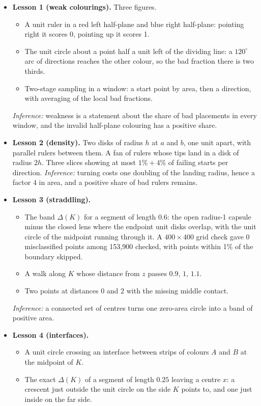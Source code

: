 \documentclass[11pt]{article}
\theoremstyle{definition}
\theoremstyle{remark}
\begin{document}
\begin{itemize}
\item \textbf{Lesson 1 (weak colourings).} Three figures.
  \begin{itemize}
  \item A unit ruler in a red left half-plane and blue right half-plane: pointing right it scores 0, pointing up it scores 1.
  \item The unit circle about a point half a unit left of the dividing line: a $120^\circ$ arc of directions reaches the other colour, so the bad fraction there is two thirds.
  \item Two-stage sampling in a window: a start point by area, then a direction, with averaging of the local bad fractions.
  \end{itemize}
  \emph{Inference:} weakness is a statement about the share of bad placements in every window, and the invalid half-plane colouring has a positive share.
\item \textbf{Lesson 2 (density).} Two disks of radius $h$ at $a$ and $b$, one unit apart, with parallel rulers between them. A fan of rulers whose tips land in a disk of radius $2h$. Three slices showing at most $1\%+4\%$ of failing starts per direction. \emph{Inference:} turning costs one doubling of the landing radius, hence a factor $4$ in area, and a positive share of bad rulers remains.
\item \textbf{Lesson 3 (straddling).}
  \begin{itemize}
  \item The band $\Delta(K)$ for a segment of length $0.6$: the open radius-1 capsule minus the closed lens where the endpoint unit disks overlap, with the unit circle of the midpoint running through it. A $400\times400$ grid check gave 0 misclassified points among 153,900 checked, with points within 1\% of the boundary skipped.
  \item A walk along $K$ whose distance from $z$ passes $0.9$, $1$, $1.1$.
  \item Two points at distances $0$ and $2$ with the missing middle contact.
  \end{itemize}
  \emph{Inference:} a connected set of centres turns one zero-area circle into a band of positive area.
\item \textbf{Lesson 4 (interfaces).}
  \begin{itemize}
  \item A unit circle crossing an interface between strips of colours $A$ and $B$ at the midpoint of $K$.
  \item The exact $\Delta(K)$ of a segment of length $0.25$ leaving a centre $x$: a crescent just outside the unit circle on the side $K$ points to, and one just inside on the far side.

\end{itemize}
\end{itemize}
\end{document}
